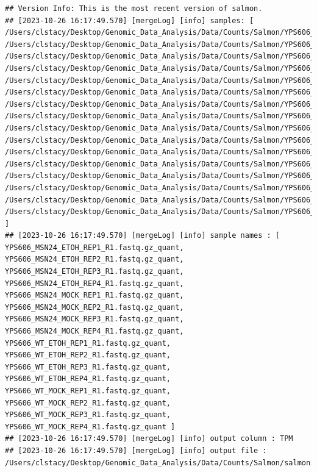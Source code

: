 \documentclass[
]{book}
\begin{document}
\begin{verbatim}
## Version Info: This is the most recent version of salmon.
## [2023-10-26 16:17:49.570] [mergeLog] [info] samples: [ /Users/clstacy/Desktop/Genomic_Data_Analysis/Data/Counts/Salmon/YPS606_MSN24_ETOH_REP1_R1.fastq.gz_quant, /Users/clstacy/Desktop/Genomic_Data_Analysis/Data/Counts/Salmon/YPS606_MSN24_ETOH_REP2_R1.fastq.gz_quant, /Users/clstacy/Desktop/Genomic_Data_Analysis/Data/Counts/Salmon/YPS606_MSN24_ETOH_REP3_R1.fastq.gz_quant, /Users/clstacy/Desktop/Genomic_Data_Analysis/Data/Counts/Salmon/YPS606_MSN24_ETOH_REP4_R1.fastq.gz_quant, /Users/clstacy/Desktop/Genomic_Data_Analysis/Data/Counts/Salmon/YPS606_MSN24_MOCK_REP1_R1.fastq.gz_quant, /Users/clstacy/Desktop/Genomic_Data_Analysis/Data/Counts/Salmon/YPS606_MSN24_MOCK_REP2_R1.fastq.gz_quant, /Users/clstacy/Desktop/Genomic_Data_Analysis/Data/Counts/Salmon/YPS606_MSN24_MOCK_REP3_R1.fastq.gz_quant, /Users/clstacy/Desktop/Genomic_Data_Analysis/Data/Counts/Salmon/YPS606_MSN24_MOCK_REP4_R1.fastq.gz_quant, /Users/clstacy/Desktop/Genomic_Data_Analysis/Data/Counts/Salmon/YPS606_WT_ETOH_REP1_R1.fastq.gz_quant, /Users/clstacy/Desktop/Genomic_Data_Analysis/Data/Counts/Salmon/YPS606_WT_ETOH_REP2_R1.fastq.gz_quant, /Users/clstacy/Desktop/Genomic_Data_Analysis/Data/Counts/Salmon/YPS606_WT_ETOH_REP3_R1.fastq.gz_quant, /Users/clstacy/Desktop/Genomic_Data_Analysis/Data/Counts/Salmon/YPS606_WT_ETOH_REP4_R1.fastq.gz_quant, /Users/clstacy/Desktop/Genomic_Data_Analysis/Data/Counts/Salmon/YPS606_WT_MOCK_REP1_R1.fastq.gz_quant, /Users/clstacy/Desktop/Genomic_Data_Analysis/Data/Counts/Salmon/YPS606_WT_MOCK_REP2_R1.fastq.gz_quant, /Users/clstacy/Desktop/Genomic_Data_Analysis/Data/Counts/Salmon/YPS606_WT_MOCK_REP3_R1.fastq.gz_quant, /Users/clstacy/Desktop/Genomic_Data_Analysis/Data/Counts/Salmon/YPS606_WT_MOCK_REP4_R1.fastq.gz_quant ]
## [2023-10-26 16:17:49.570] [mergeLog] [info] sample names : [ YPS606_MSN24_ETOH_REP1_R1.fastq.gz_quant, YPS606_MSN24_ETOH_REP2_R1.fastq.gz_quant, YPS606_MSN24_ETOH_REP3_R1.fastq.gz_quant, YPS606_MSN24_ETOH_REP4_R1.fastq.gz_quant, YPS606_MSN24_MOCK_REP1_R1.fastq.gz_quant, YPS606_MSN24_MOCK_REP2_R1.fastq.gz_quant, YPS606_MSN24_MOCK_REP3_R1.fastq.gz_quant, YPS606_MSN24_MOCK_REP4_R1.fastq.gz_quant, YPS606_WT_ETOH_REP1_R1.fastq.gz_quant, YPS606_WT_ETOH_REP2_R1.fastq.gz_quant, YPS606_WT_ETOH_REP3_R1.fastq.gz_quant, YPS606_WT_ETOH_REP4_R1.fastq.gz_quant, YPS606_WT_MOCK_REP1_R1.fastq.gz_quant, YPS606_WT_MOCK_REP2_R1.fastq.gz_quant, YPS606_WT_MOCK_REP3_R1.fastq.gz_quant, YPS606_WT_MOCK_REP4_R1.fastq.gz_quant ]
## [2023-10-26 16:17:49.570] [mergeLog] [info] output column : TPM
## [2023-10-26 16:17:49.570] [mergeLog] [info] output file : /Users/clstacy/Desktop/Genomic_Data_Analysis/Data/Counts/Salmon/salmon.gene_tpm.merged.yeast.tsv

\end{verbatim}
\end{document}
